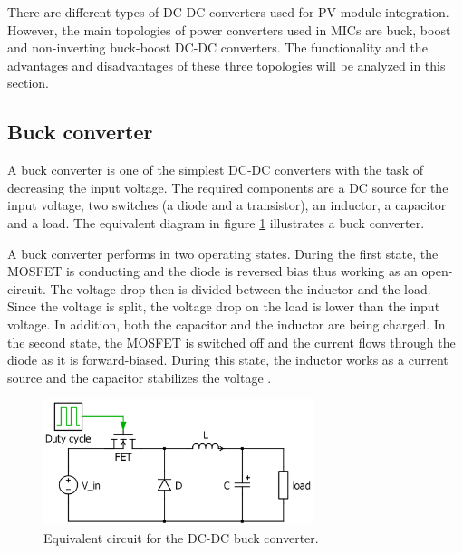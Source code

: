 There are different types of DC-DC converters used for PV module integration. However, the main topologies of power converters used in MICs are buck, boost and non-inverting buck-boost DC-DC converters. The functionality and the advantages and disadvantages of these three topologies will be analyzed in this section.

\subsection{Buck converter\label{Buck-C}}

A buck converter is one of the simplest DC-DC converters with the task of decreasing the input voltage. The required components are a DC source for the input voltage, two switches (a diode and a transistor), an inductor, a capacitor and a load. The equivalent diagram in figure \ref{Buck-converter} illustrates a buck converter. 

A buck converter performs in two operating states. 
During the first state, the MOSFET is conducting and the diode is reversed bias thus working as an open-circuit. The voltage drop  then is divided between the inductor and the load. Since the voltage is split, the voltage drop on the load is lower than the input voltage. In addition, both the capacitor and the inductor are being charged. In the second state, the MOSFET is switched off and the current flows through the diode as it is forward-biased. During this state, the inductor works as a current source and the capacitor stabilizes the voltage \cite{schematicbuckandboost}.

\begin{figure}[H]
	\begin{center}
		\includegraphics[width=0.7\textwidth]{../Pictures/Buck-converter}
		\caption{Equivalent circuit for the DC-DC buck converter.}
		\label{Buck-converter}
	\end{center}	
\end{figure}

